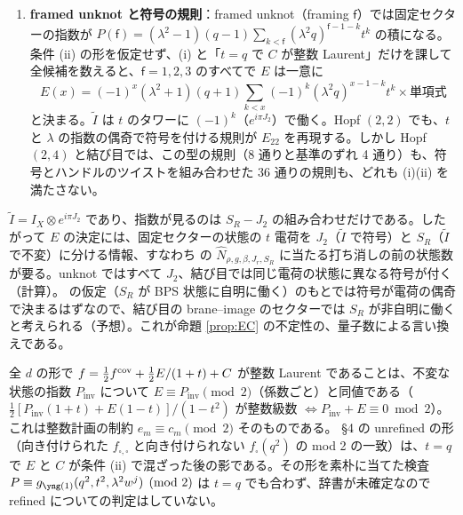 \begin{compresult}
\begin{enumerate}
\item \textbf{framed unknot と符号の規則}：framed unknot（framing $\mathsf{f}$）では固定セクターの指数が $P(\mathsf{f}) = (\lambda^2-1)(q-1)\sum_{k<\mathsf{f}}(\lambda^2q)^{\mathsf{f}-1-k}t^k$ の積になる。条件 (ii) の形を仮定せず、(i) と「$t = q$ で $C$ が整数 Laurent」だけを課して全候補を数えると、$\mathsf{f} = 1, 2, 3$ のすべてで $E$ は一意に
\[
E(x) = (-1)^x(\lambda^2+1)(q+1)\sum_{k<x}(-1)^k(\lambda^2q)^{x-1-k}t^k\times\text{単項式}
\]
と決まる。$\tilde I$ は $t$ のタワーに $(-1)^k$（$e^{i\pi J_2}$）で働く。Hopf $(2,2)$ でも、$t$ と $\lambda$ の指数の偶奇で符号を付ける規則が $E_{22}$ を再現する。しかし Hopf $(2,4)$ と結び目では、この型の規則（8 通りと基準のずれ 4 通り）も、符号とハンドルのツイストを組み合わせた 36 通りの規則も、どれも (i)(ii) を満たさない。
\end{enumerate}
\end{compresult}
$\tilde I = I_X\otimes e^{i\pi J_2}$ であり、指数が見るのは $S_R - J_2$ の組み合わせだけである。したがって $E$ の決定には、固定セクターの状態の $t$ 電荷を $J_2$（$\tilde I$ で符号）と $S_R$（$\tilde I$ で不変）に分ける情報、すなわち \cite{KN17} の $\hat N_{\rho,g,\beta,J_r,S_R}$ に当たる打ち消しの前の状態数が要る。unknot ではすべて $J_2$、結び目では同じ電荷の状態に異なる符号が付く（計算）。\cite{KN17} の仮定（$S_R$ が BPS 状態に自明に働く）のもとでは符号が電荷の偶奇で決まるはずなので、結び目の brane--image のセクターでは $S_R$ が非自明に働くと考えられる（予想）。これが命題 \ref{prop:EC} の不定性の、量子数による言い換えである。

\begin{remark}
全 $d$ の形で $f = \tfrac12 f^{\mathrm{cov}} + \tfrac12 E/(1+t) + C$ が整数 Laurent であることは、不変な状態の指数 $P_{\mathrm{inv}}$ について $E \equiv P_{\mathrm{inv}} \pmod 2$（係数ごと）と同値である（$\tfrac12[P_{\mathrm{inv}}(1+t) + E(1-t)]/(1-t^2)$ が整数級数 $\Leftrightarrow P_{\mathrm{inv}} + E \equiv 0 \bmod 2$）。これは整数計画の制約 $e_m \equiv c_m \pmod 2$ そのものである。\cite{AgSc12} §4 の unrefined の形（向き付けられた $f_{\square,\square}$ と向き付けられない $f_\square(q^2)$ の mod 2 の一致）は、$t = q$ で $E$ と $C$ が条件 (ii) で混ざった後の影である。その形を素朴に当てた検査 $P \equiv g_{\yone}(q^2,t^2,\lambda^2 w^j) \pmod 2$ は $t = q$ でも合わず、辞書が未確定なので refined についての判定はしていない。
\end{remark}

